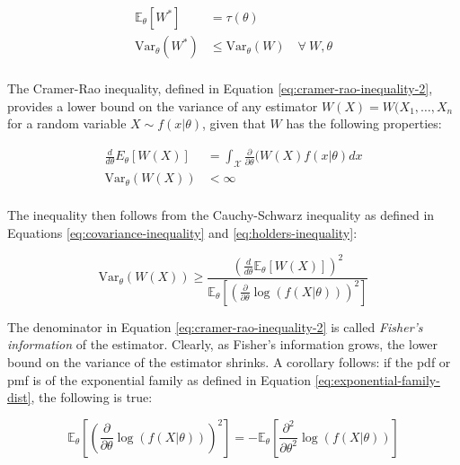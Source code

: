 \documentclass{report}
\begin{document}
\begin{equation}\label{eq:umvue-properties}
    \begin{aligned}
        \mathbb{E}_\theta[W^*] &= \tau(\theta) \\
        \text{Var}_\theta(W^*) &\leq \text{Var}_\theta(W) \quad \forall \: W, \theta \\
    \end{aligned}
\end{equation}

The Cramer-Rao inequality, defined in Equation \ref{eq:cramer-rao-inequality-2}, provides a lower bound on the variance of any estimator $W(X) = W(X_1, \dots, X_n$ for a random variable $X \sim f(x|\theta)$, given that $W$ has the following properties:

\begin{equation}\label{eq:cramer-rao-inequality-1}
    \begin{aligned}
        \frac{d}{d\theta} E_\theta[W(X)] &= \int_{\mathcal{X}} \frac{\partial}{\partial\theta} (W(X)f(x|\theta) dx \\
        \text{Var}_\theta(W(X)) &< \infty \\
    \end{aligned}
\end{equation}

The inequality then follows from the Cauchy-Schwarz inequality as defined in Equations \ref{eq:covariance-inequality} and \ref{eq:holders-inequality}:

\begin{equation}\label{eq:cramer-rao-inequality-2}
    \text{Var}_\theta(W(X)) \geq \frac{\left(\frac{d}{d\theta}\mathbb{E}_\theta[W(X)]\right)^2}{\mathbb{E}_\theta\left[\left(\frac{\partial}{\partial\theta}\log(f(X|\theta))\right)^2\right]}
\end{equation}

The denominator in Equation \ref{eq:cramer-rao-inequality-2} is called \textit{Fisher's information} of the estimator. Clearly, as Fisher's information grows, the lower bound on the variance of the estimator shrinks. A corollary follows: if the \gls{pdf} or \gls{pmf} is of the exponential family as defined in Equation \ref{eq:exponential-family-dist}, the following is true:

\begin{equation}\label{eq:fisher-information}
    \mathbb{E}_\theta\left[\left(\frac{\partial}{\partial\theta}\log(f(X|\theta))\right)^2\right] = -\mathbb{E}_\theta\left[\frac{\partial^2}{\partial\theta^2} \log(f(X|\theta))\right]
\end{equation}
\end{document}

